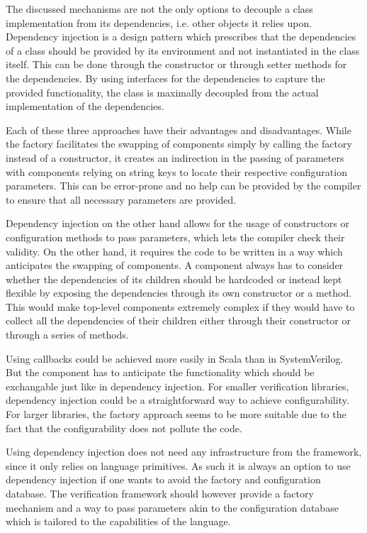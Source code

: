 The discussed mechanisms are not the only options to decouple a class implementation from its dependencies, i.e. other
objects it relies upon. Dependency injection is a design pattern which prescribes that the dependencies of a class
should be provided by its environment and not instantiated in the class itself. This can be done through the
constructor or through setter methods for the dependencies. By using interfaces for the dependencies to capture the
provided functionality, the class is maximally decoupled from the actual implementation of the dependencies.


Each of these three approaches have their advantages and disadvantages. While the factory facilitates the swapping of
components simply by calling the factory instead of a constructor, it creates an indirection in the passing of
parameters with components relying on string keys to locate their respective configuration parameters.
This can be error-prone and no help can be provided by the compiler to ensure that all necessary parameters are provided.

Dependency injection on the other hand allows for the usage of constructors or configuration methods to pass
parameters, which lets the compiler check their validity. On the other hand, it requires the code to be written in a
way which anticipates the swapping of components. A component always has to consider whether the dependencies of its
children should be hardcoded or instead kept flexible by exposing the dependencies through its own constructor or a method. This
would make top-level components extremely complex if they would have to collect all the dependencies of their
children either through their constructor or through a series of methods.

Using callbacks could be achieved more easily in Scala than in SystemVerilog. But the component has to anticipate the
functionality which should be exchangable just like in dependency injection. For smaller verification libraries, dependency injection could be a straightforward way to achieve configurability. For
larger libraries, the factory approach seems to be more suitable due to the fact that the configurability does not
pollute the code.

Using dependency injection does not need any infrastructure from the framework, since it only relies on language
primitives. As such it is always an option to use dependency injection if one wants to avoid the factory and
configuration database. The verification framework should however provide a factory mechanism and a way to pass parameters
akin to the configuration database which is tailored to the capabilities of the language.


